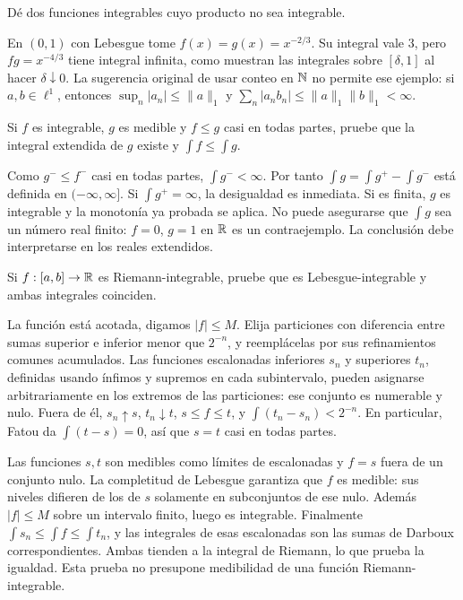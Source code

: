 \begin{ejercicio}\label{ej:v2-l09-4}
Dé dos funciones integrables cuyo producto no sea integrable.
\end{ejercicio}
\begin{solucion}
En $(0,1)$ con Lebesgue tome $f(x)=g(x)=x^{-2/3}$. Su integral vale $3$, pero $fg=x^{-4/3}$ tiene integral infinita, como muestran las integrales sobre $[\delta,1]$ al hacer $\delta\downarrow0$. La sugerencia original de usar conteo en $\mathbb N$ no permite ese ejemplo: si $a,b\in\ell^1$, entonces $\sup_n|a_n|\le\|a\|_1$ y $\sum_n|a_nb_n|\le\|a\|_1\|b\|_1<\infty$.
\end{solucion}

\begin{ejercicio}\label{ej:v2-l09-5}
Si $f$ es integrable, $g$ es medible y $f\le g$ casi en todas partes, pruebe que la integral extendida de $g$ existe y $\int f\le\int g$.
\end{ejercicio}
\begin{solucion}
Como $g^-\le f^-$ casi en todas partes, $\int g^-<\infty$. Por tanto $\int g=\int g^+-\int g^-$ está definida en $(-\infty,\infty]$. Si $\int g^+=\infty$, la desigualdad es inmediata. Si es finita, $g$ es integrable y la monotonía ya probada se aplica. No puede asegurarse que $\int g$ sea un número real finito: $f=0$, $g=1$ en $\mathbb R$ es un contraejemplo. La conclusión debe interpretarse en los reales extendidos.
\end{solucion}

\begin{ejercicio}\label{ej:v2-l09-6}
Si $f:[a,b]\to\mathbb R$ es Riemann-integrable, pruebe que es Lebesgue-integrable y ambas integrales coinciden.
\end{ejercicio}
\begin{solucion}
La función está acotada, digamos $|f|\le M$. Elija particiones con diferencia entre sumas superior e inferior menor que $2^{-n}$, y reemplácelas por sus refinamientos comunes acumulados. Las funciones escalonadas inferiores $s_n$ y superiores $t_n$, definidas usando ínfimos y supremos en cada subintervalo, pueden asignarse arbitrariamente en los extremos de las particiones: ese conjunto es numerable y nulo. Fuera de él, $s_n\uparrow s$, $t_n\downarrow t$, $s\le f\le t$, y $\int(t_n-s_n)<2^{-n}$. En particular, Fatou da $\int(t-s)=0$, así que $s=t$ casi en todas partes.

Las funciones $s,t$ son medibles como límites de escalonadas y $f=s$ fuera de un conjunto nulo. La completitud de Lebesgue garantiza que $f$ es medible: sus niveles difieren de los de $s$ solamente en subconjuntos de ese nulo. Además $|f|\le M$ sobre un intervalo finito, luego es integrable. Finalmente $\int s_n\le\int f\le\int t_n$, y las integrales de esas escalonadas son las sumas de Darboux correspondientes. Ambas tienden a la integral de Riemann, lo que prueba la igualdad. Esta prueba no presupone medibilidad de una función Riemann-integrable.
\end{solucion}

